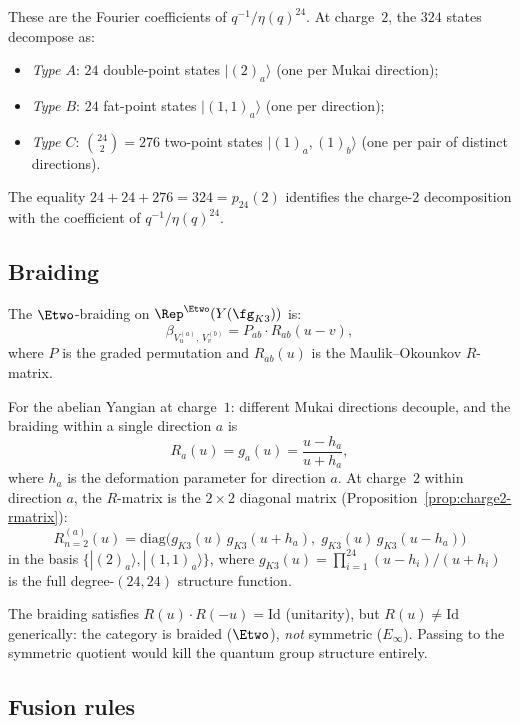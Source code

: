 \noindent These are the Fourier coefficients of $q^{-1}/\eta(q)^{24}$.
At charge~$2$, the $324$ states decompose as:
\begin{itemize}
 \item \emph{Type $A$}: $24$ double-point states $|(2)_a\rangle$
 (one per Mukai direction);
 \item \emph{Type $B$}: $24$ fat-point states $|(1,1)_a\rangle$
 (one per direction);
 \item \emph{Type $C$}: $\binom{24}{2} = 276$ two-point states
 $|(1)_a, (1)_b\rangle$ (one per pair of distinct directions).
\end{itemize}
The equality $24 + 24 + 276 = 324 = p_{24}(2)$ identifies the
charge-$2$ decomposition with the coefficient of $q^{-1}/\eta(q)^{24}$.

\subsection{Braiding}
\label{subsec:chiral-qg-braiding}

The $\Etwo$-braiding on $\Rep^{\Etwo}(Y(\fg_{K3}))$ is:
\[
 \beta_{V_u^{(a)},\, V_v^{(b)}}
 = P_{ab} \cdot R_{ab}(u - v),
\]
where $P$ is the graded permutation and $R_{ab}(u)$ is the
Maulik--Okounkov $R$-matrix.

For the abelian Yangian at charge~$1$: different Mukai directions
decouple, and the braiding within a single direction $a$ is
\[
 R_a(u) = g_a(u) = \frac{u - h_a}{u + h_a},
\]
where $h_a$ is the deformation parameter for direction $a$. At
charge~$2$ within direction $a$, the $R$-matrix is the $2 \times 2$
diagonal matrix (Proposition~\ref{prop:charge2-rmatrix}):
\[
 R^{(a)}_{n=2}(u)
 = \mathrm{diag}\bigl(g_{K3}(u)\, g_{K3}(u + h_a),\;
 g_{K3}(u)\, g_{K3}(u - h_a)\bigr)
\]
in the basis $\{|(2)_a\rangle, |(1,1)_a\rangle\}$, where
$g_{K3}(u) = \prod_{i=1}^{24}(u - h_i)/(u + h_i)$ is the full
degree-$(24,24)$ structure function.

\begin{remark}
\label{rem:chiral-qg-nonsymmetric}
The braiding satisfies
$R(u) \cdot R(-u) = \mathrm{Id}$ (unitarity), but $R(u) \neq \mathrm{Id}$
generically: the category is braided ($\Etwo$), \emph{not} symmetric
($E_\infty$). Passing to the symmetric quotient would kill the
quantum group structure entirely.
\end{remark}

\subsection{Fusion rules}
\label{subsec:chiral-qg-fusion}

